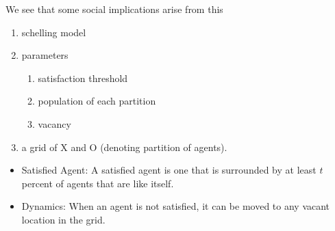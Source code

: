 We see that some social implications arise from this
\begin{enumerate}
	\item schelling model
	\item parameters
	      \begin{enumerate}
		      \item satisfaction threshold
		      \item population of each partition
		      \item vacancy
	      \end{enumerate}
	\item a grid of X and O (denoting partition of agents).
\end{enumerate}

\begin{itemize}
	\item Satisfied Agent: A satisfied agent is one that is surrounded by at least \(t\) percent of agents that are like itself.
	\item Dynamics: When an agent is not satisfied, it can be moved to any vacant location in the grid.
\end{itemize}

